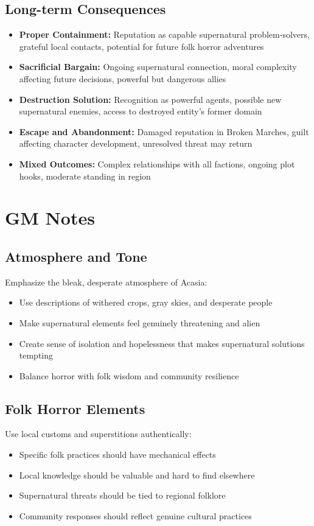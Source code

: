 \documentclass[11pt]{article}
\begin{document}
\subsection{Long-term Consequences}
\begin{itemize}
\item \textbf{Proper Containment:} Reputation as capable supernatural problem-solvers, grateful local contacts, potential for future folk horror adventures
\item \textbf{Sacrificial Bargain:} Ongoing supernatural connection, moral complexity affecting future decisions, powerful but dangerous allies
\item \textbf{Destruction Solution:} Recognition as powerful agents, possible new supernatural enemies, access to destroyed entity's former domain
\item \textbf{Escape and Abandonment:} Damaged reputation in Broken Marches, guilt affecting character development, unresolved threat may return
\item \textbf{Mixed Outcomes:} Complex relationships with all factions, ongoing plot hooks, moderate standing in region
\end{itemize}

\section{GM Notes}

\subsection{Atmosphere and Tone}
Emphasize the bleak, desperate atmosphere of Acasia:
\begin{itemize}
\item Use descriptions of withered crops, gray skies, and desperate people
\item Make supernatural elements feel genuinely threatening and alien
\item Create sense of isolation and hopelessness that makes supernatural solutions tempting
\item Balance horror with folk wisdom and community resilience
\end{itemize}

\subsection{Folk Horror Elements}
Use local customs and superstitions authentically:
\begin{itemize}
\item Specific folk practices should have mechanical effects
\item Local knowledge should be valuable and hard to find elsewhere
\item Supernatural threats should be tied to regional folklore
\item Community responses should reflect genuine cultural practices
\end{itemize}
\end{document}

